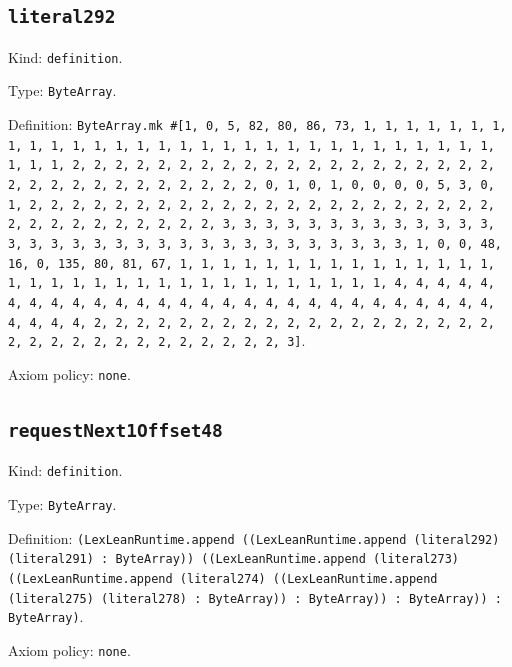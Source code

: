 \documentclass[11pt]{article}
\begin{document}
\subsection*{\texttt{literal292}}
\noindent Kind: \texttt{definition}.\par
\noindent Type: \texttt{ByteArray}.\par
\noindent Definition: \texttt{ByteArray.mk \#[1, 0, 5, 82, 80, 86, 73, 1, 1, 1, 1, 1, 1, 1, 1, 1, 1, 1, 1, 1, 1, 1, 1, 1, 1, 1, 1, 1, 1, 1, 1, 1, 1, 1, 1, 1, 1, 1, 1, 1, 2, 2, 2, 2, 2, 2, 2, 2, 2, 2, 2, 2, 2, 2, 2, 2, 2, 2, 2, 2, 2, 2, 2, 2, 2, 2, 2, 2, 2, 2, 2, 2, 0, 1, 0, 1, 0, 0, 0, 0, 5, 3, 0, 1, 2, 2, 2, 2, 2, 2, 2, 2, 2, 2, 2, 2, 2, 2, 2, 2, 2, 2, 2, 2, 2, 2, 2, 2, 2, 2, 2, 2, 2, 2, 2, 2, 3, 3, 3, 3, 3, 3, 3, 3, 3, 3, 3, 3, 3, 3, 3, 3, 3, 3, 3, 3, 3, 3, 3, 3, 3, 3, 3, 3, 3, 3, 3, 3, 1, 0, 0, 48, 16, 0, 135, 80, 81, 67, 1, 1, 1, 1, 1, 1, 1, 1, 1, 1, 1, 1, 1, 1, 1, 1, 1, 1, 1, 1, 1, 1, 1, 1, 1, 1, 1, 1, 1, 1, 1, 1, 1, 4, 4, 4, 4, 4, 4, 4, 4, 4, 4, 4, 4, 4, 4, 4, 4, 4, 4, 4, 4, 4, 4, 4, 4, 4, 4, 4, 4, 4, 4, 4, 4, 2, 2, 2, 2, 2, 2, 2, 2, 2, 2, 2, 2, 2, 2, 2, 2, 2, 2, 2, 2, 2, 2, 2, 2, 2, 2, 2, 2, 2, 2, 2, 2, 3]}.\par
\noindent Axiom policy: \texttt{none}.\par
\subsection*{\texttt{requestNext1Offset48}}
\noindent Kind: \texttt{definition}.\par
\noindent Type: \texttt{ByteArray}.\par
\noindent Definition: \texttt{(LexLeanRuntime.append ((LexLeanRuntime.append (literal292) (literal291) : ByteArray)) ((LexLeanRuntime.append (literal273) ((LexLeanRuntime.append (literal274) ((LexLeanRuntime.append (literal275) (literal278) : ByteArray)) : ByteArray)) : ByteArray)) : ByteArray)}.\par
\noindent Axiom policy: \texttt{none}.\par
\end{document}
